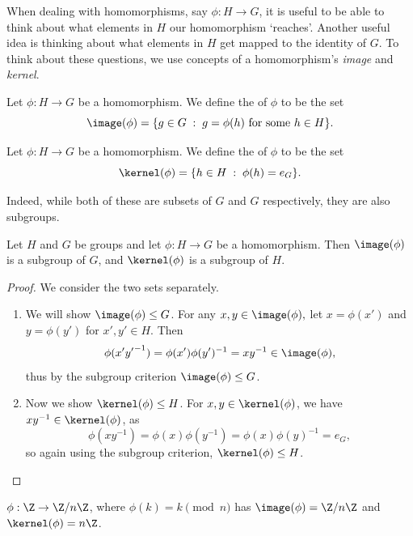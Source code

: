 
When dealing with homomorphisms, say $\phi : H \rightarrow G$, it is useful to be able to think about what elements in $H$ our homomorphism `reaches'.
Another useful idea is thinking about what elements in $H$ get mapped to the identity of $G$. To think about these questions, we use concepts of a homomorphism's \emph{image} and \emph{kernel}. 

\begin{definition}[Image]
	Let $\phi :H \rightarrow G$ be a homomorphism. We define the  of $\phi$ to be the set
	$$
	\image(\phi) = \{ g \in G \; : \; g = \phi(h) \text{ for some } h \in H  \}.
	$$
\end{definition}
\begin{definition}[Kernel]
	Let $\phi : H \rightarrow G$ be a homomorphism. We define the  of $\phi$ to be the set
	$$
	\kernel(\phi) = \{ h \in H \; : \; \phi(h) = e_G \}.
	$$
\end{definition}

Indeed, while both of these are subsets of $G$ and $G$ respectively, they are also subgroups.

\begin{proposition}
	Let $H$ and $G$ be groups and let $\phi : H \rightarrow G$ be a homomorphism. Then $\image(\phi)$ is a subgroup of $G$, and $\kernel(\phi)$ is a subgroup of $H$.
\end{proposition}
\begin{proof}
	We consider the two sets separately.
	\begin{enumerate}
		\item We will show $\image(\phi) \leq G$. For any $x, y \in \image(\phi),$ let $x = \phi(x')$ and $y = \phi(y')$ for $x', y' \in H$. Then
		$$
		\phi(x' {y'}^{-1}) = \phi(x')\phi(y')^{-1} = x y^{-1} \in \image(\phi),
		$$
		thus by the subgroup criterion $\image(\phi) \leq G$.
		\item Now we show $\kernel(\phi) \leq H$. For $x, y \in \kernel(\phi)$, we have $xy^{-1} \in \kernel(\phi)$, as 
		$$
		\phi(xy^{-1}) = \phi(x)\phi(y^{-1}) = \phi(x)\phi(y)^{-1} = e_G,
		$$
		so again using the subgroup criterion, $\kernel(\phi) \leq H$. 
	\end{enumerate}
\end{proof}

\begin{example}
	$\phi : \Z \rightarrow \Z/n\Z$, where $\phi(k) = k \pmod{n}$ has $\image(\phi) = \Z/n\Z$ and $\kernel(\phi) = n\Z$.
\end{example}

